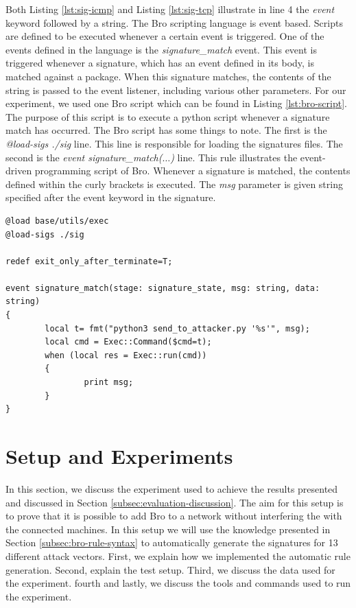 Both Listing \ref{lst:sig-icmp} and Listing \ref{lst:sig-tcp} illustrate in line 4 the \emph{event} keyword followed by a string. The Bro scripting language is event based. Scripts are defined to be executed whenever a certain event is triggered. One of the events defined in the language is the \emph{signature\_match} event. This event is triggered whenever a signature, which has an event defined in its body, is matched against a package. When this signature matches, the contents of the string is passed to the event listener, including various other parameters. For our experiment, we used one Bro script which can be found in Listing \ref{lst:bro-script}. The purpose of this script is to execute a python script whenever a signature match has occurred. The Bro script has some things to note. The first is the \emph{@load-sigs ./sig} line. This line is responsible for loading the signatures files. The second is the \emph{event signature\_match($\dots$)} line. This rule illustrates the event-driven programming script of Bro. Whenever a signature is matched, the contents defined within the curly brackets is executed. The \emph{msg} parameter is given string specified after the event keyword in the signature.  

  
\begin{lstlisting}[caption={Bro script which executes whenever signature match occurs}, label={lst:bro-script}, float=tp, floatplacement=tbp,]
@load base/utils/exec
@load-sigs ./sig

redef exit_only_after_terminate=T;

event signature_match(stage: signature_state, msg: string, data: string)
{
        local t= fmt("python3 send_to_attacker.py '%s'", msg);
        local cmd = Exec::Command($cmd=t);
        when (local res = Exec::run(cmd))
        {
                print msg;
        }
}
\end{lstlisting} 





\section{Setup and Experiments}\label{subsec:methodology}
In this section, we discuss the experiment used to achieve the results presented and discussed in Section \ref{subsec:evaluation-discussion}. The aim for this setup is to prove that it is possible to add Bro to a network without interfering the with the connected machines. In this setup we will use the knowledge presented in Section \ref{subsec:bro-rule-syntax} to automatically generate the signatures for 13 different attack vectors. First, we explain how we implemented the automatic rule generation. Second, explain the test setup. Third, we discuss the data used for the experiment. fourth and lastly, we discuss the tools and commands used to run the experiment. 

